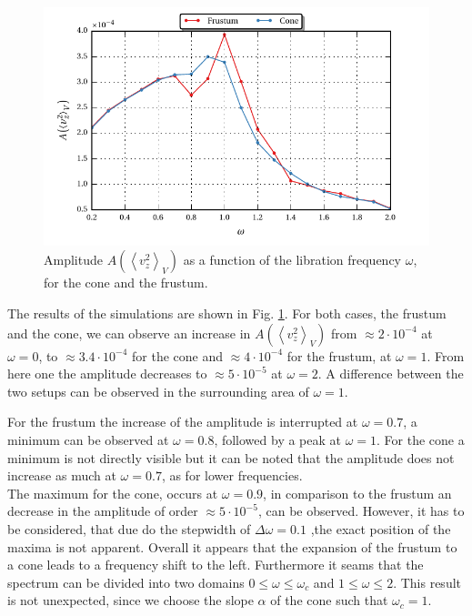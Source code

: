 \begin{figure}[!bp]
  \centering
  \includegraphics{gfx/cone/experiment/experiment.pdf}
  \caption{Amplitude $A\left(\left<v^2_z\right>_V\right)$ as a function of the libration frequency $\omega$,
            for the cone and the frustum.  \label{fig:cone_expseries} }
\end{figure}

The results of the simulations are shown in Fig. \ref{fig:cone_expseries}.
For both cases, the frustum and the cone, we can observe an increase in $A\left(\left<v^2_z\right>_V\right)$
from $\approx 2\cdot10^{-4}$ at $\omega=0$, to  $\approx 3.4\cdot10^{-4}$ for the cone and $\approx 4\cdot10^{-4}$ for the frustum,  at $\omega=1$.
From here one the amplitude decreases to $\approx 5\cdot10^{-5}$ at $\omega=2$.
A difference between the two setups can be observed in the surrounding area of $\omega=1$.

For the frustum the increase of the amplitude is interrupted at $\omega=0.7$, a minimum can be observed at $\omega=0.8$, followed by
a peak at $\omega=1$. For the cone a minimum is not directly visible but it can be noted that the
amplitude does not increase as much at $\omega=0.7$, as for lower frequencies.\\
The maximum for the cone, occurs at $\omega=0.9$, in comparison to the frustum an decrease in the amplitude of order $\approx 5\cdot10^{-5}$, can be observed.
However, it has to be considered, that due do the stepwidth of $\Delta\omega = 0.1$ ,the exact position of the maxima is not apparent.
Overall it appears that the expansion of the frustum to a cone leads to a frequency shift to the left.
Furthermore it seams that the spectrum can be divided into two domains $0\leq\omega\leq\omega_c$ and $1 \leq \omega\leq 2$.
This result is not unexpected, since we choose the slope $\alpha$ of the cone such that $\omega_c=1$.


